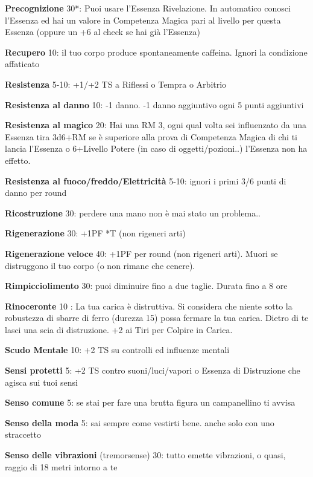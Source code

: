 \documentclass[a4paper,11pt,twoside,openany]{book}
\begin{document}
\textbf{Precognizione} 30{*}: Puoi usare l'Essenza Rivelazione. In automatico conosci l'Essenza ed hai un valore in Competenza Magica pari al livello per questa Essenza (oppure un +6 al check se hai già l'Essenza)

\textbf{Recupero} 10: il tuo corpo produce spontaneamente caffeina.  Ignori la condizione affaticato

\textbf{Resistenza} 5-10: +1/+2 TS a Riflessi o Tempra o Arbitrio

\textbf{Resistenza al danno} 10: -1 danno. -1 danno aggiuntivo ogni 5 punti aggiuntivi

\textbf{Resistenza al magico} 20: Hai una RM 3, ogni qual volta sei influenzato da una Essenza tira 3d6+RM se è superiore alla prova di Competenza Magica di chi ti lancia l'Essenza o 6+Livello Potere (in caso di oggetti/pozioni..) l'Essenza non ha effetto.

\textbf{Resistenza al fuoco/freddo/Elettricità} 5-10: ignori i primi 3/6 punti di danno per round

\textbf{Ricostruzione} 30: perdere una mano non è mai stato un problema..

\textbf{Rigenerazione} 30: +1PF {*}T (non rigeneri arti)

\textbf{Rigenerazione} \textbf{veloce} 40: +1PF per round (non rigeneri arti). Muori se distruggono il tuo corpo (o non rimane che cenere).

\textbf{Rimpicciolimento} 30: puoi diminuire fino a due taglie. Durata fino a 8 ore

\textbf{Rinoceronte} 10 : La tua carica è distruttiva. Si considera che niente sotto la robustezza di sbarre di ferro (durezza 15) possa fermare la tua carica. Dietro di te lasci una scia di distruzione. +2 ai Tiri per Colpire in Carica.

\textbf{Scudo Mentale} 10: +2 TS su controlli ed influenze mentali

\textbf{Sensi protetti} 5: +2 TS contro suoni/luci/vapori o Essenza di Distruzione che agisca sui tuoi sensi

\textbf{Senso comune} 5: se stai per fare una brutta figura un campanellino ti avvisa

\textbf{Senso della moda} 5: sai sempre come vestirti bene. anche solo con uno straccetto

\textbf{Senso delle vibrazioni}   (tremorsense) 30: tutto emette vibrazioni, o quasi, raggio di 18 metri intorno a te
\end{document}
